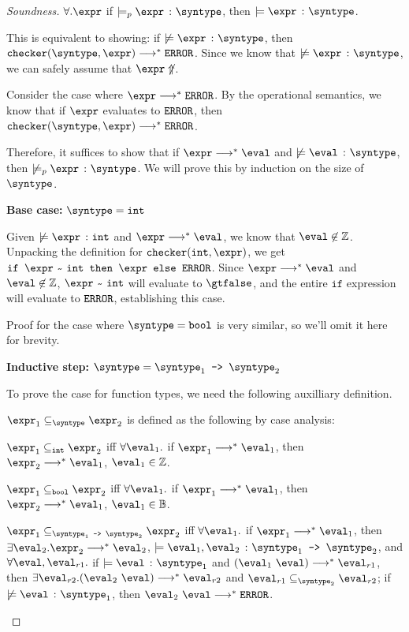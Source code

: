 \begin{proof}[Soundness]
  $\forall. \expr$ if $\models_p \hastype{\expr}{\syntype}$, then $\models \hastype{\expr}{\syntype}$.

  This is equivalent to showing: if $\not\models \hastype{\expr}{\syntype}$, then $\mkche{\syntype}{\expr} \smallsteps[] \eerror$. Since we know that $\not \models \hastype{\expr}{\syntype}$, we can safely assume that $\expr \not\Uparrow$. 

  Consider the case where $\expr \smallsteps[] \eerror$. By the operational semantics, we know that if $\expr$ evaluates to $\texttt{ERROR}$, then $\mkche{\syntype}{\expr} \smallsteps[] \eerror$.

  Therefore, it suffices to show that if $\expr \smallsteps[] \eval$ and $\not \models \hastype{\eval}{\syntype}$, then $\not\models_p \hastype{\expr}{\syntype}$. We will prove this by induction on the size of $\syntype$.

  \textbf{Base case: }$\syntype = \tint$

  Given $\not \models \hastype{\expr}{\tint}$ and $\expr \smallsteps[] \eval$, we know that $\eval \not\in \mathbb{Z}$. Unpacking the definition for $\mkche{\tint}{\expr}$, we get $\ife{\matches{\expr}{\tint}}{\expr}{\eerror}$. Since $\expr \smallsteps[] \eval$ and $\eval \not\in \mathbb{Z}$, $\matches{\expr}{\tint}$ will evaluate to $\gtfalse$, and the entire $\texttt{if}$ expression will evaluate to $\texttt{ERROR}$, establishing this case.

  Proof for the case where $\syntype = \tbool$ is very similar, so we'll omit it here for brevity.

  \textbf{Inductive step: }$\syntype = \mkfun{\syntype_1}{\syntype_2}$

  To prove the case for function types, we need the following auxilliary definition.

  \begin{definition}
    $\expr_1 \subseteq_{\syntype} \expr_2$ is defined as the following by case analysis:

    $\expr_1 \subseteq_{\tint} \expr_2$ iff $\forall \eval_1.$ if $\expr_1 \smallsteps[] \eval_1$, then $\expr_2 \smallsteps[] \eval_1$, $\eval_1 \in \mathbb{Z}$.

    $\expr_1 \subseteq_{\tbool} \expr_2$ iff $\forall \eval_1.$ if $\expr_1 \smallsteps[] \eval_1$, then $\expr_2 \smallsteps[] \eval_1$, $\eval_1 \in \mathbb{B}$.

    $\expr_1 \subseteq_{\mkfun{\syntype_1}{\syntype_2}} \expr_2$ iff $\forall \eval_1.$ if $\expr_1 \smallsteps[] \eval_1$, then $\exists \eval_2. \expr_2 \smallsteps[] \eval_2$, $\models \hastype{\eval_1, \eval_2}{\mkfun{\syntype_1}{\syntype_2}}$, and $\forall \eval, \eval_{r1}.$ if $\models \hastype{\eval}{\syntype_1}$ and $(\eval_1 \ \eval) \smallsteps[] \eval_{r1}$, then $\exists \eval_{r2}. (\eval_2 \ \eval) \smallsteps[] \eval_{r2}$ and $\eval_{r1} \subseteq_{\syntype_2} \eval_{r2}$; if $\not\models \hastype{\eval}{\syntype_1}$, then $\eval_2 \ \eval \smallsteps[] \eerror$.


\end{definition}
\end{proof}
